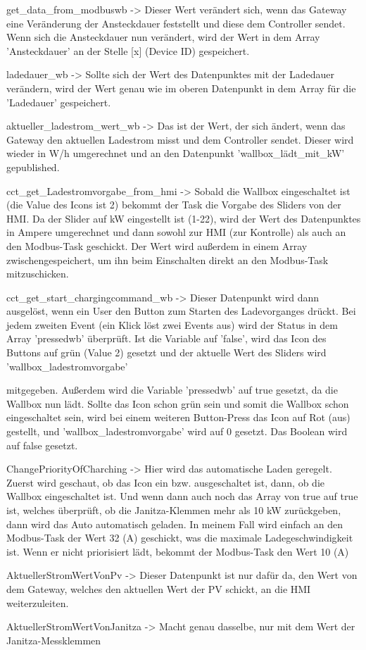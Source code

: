 \begin{compactitem}
\item get\_data\_from\_modbuswb -> Dieser Wert verändert sich, wenn das Gateway eine Veränderung der Ansteckdauer feststellt und diese dem Controller sendet. Wenn sich die Ansteckdauer nun verändert, wird der Wert in dem Array 'Ansteckdauer' an der Stelle [x] (Device ID) gespeichert.
\item ladedauer\_wb -> Sollte sich der Wert des Datenpunktes mit der Ladedauer verändern, wird der Wert genau wie im oberen Datenpunkt in dem Array für die 'Ladedauer' gespeichert.
\item aktueller\_ladestrom\_wert\_wb -> Das ist der Wert, der sich ändert, wenn das Gateway den aktuellen Ladestrom misst und dem Controller sendet. Dieser wird wieder in W/h umgerechnet und an den Datenpunkt 'wallbox\_lädt\_mit\_kW' gepublished.
\item cct\_get\_Ladestromvorgabe\_from\_hmi -> Sobald die Wallbox eingeschaltet ist (die Value des Icons ist 2) bekommt der Task die Vorgabe des Sliders von der HMI. Da der Slider auf kW eingestellt ist (1-22), wird der Wert des Datenpunktes in Ampere umgerechnet und dann sowohl zur HMI (zur Kontrolle) als auch an den Modbus-Task geschickt. Der Wert wird außerdem in einem Array zwischengespeichert, um ihn beim Einschalten direkt an den Modbus-Task mitzuschicken.
\item cct\_get\_start\_chargingcommand\_wb -> Dieser Datenpunkt wird dann ausgelöst, wenn ein User den Button zum Starten des Ladevorganges drückt. Bei jedem zweiten Event (ein Klick löst zwei Events aus) wird der Status in dem Array 'pressedwb' überprüft. Ist die Variable auf 'false', wird das Icon des Buttons auf grün (Value 2) gesetzt und der aktuelle Wert des Sliders wird 'wallbox\_ladestromvorgabe'
\item
mitgegeben. Außerdem wird die Variable 'pressedwb' auf true gesetzt, da die Wallbox nun lädt. Sollte das Icon schon grün sein und somit die Wallbox schon eingeschaltet sein, wird bei einem weiteren Button-Press das Icon auf Rot (aus) gestellt, und 'wallbox\_ladestromvorgabe' wird auf 0 gesetzt. Das Boolean wird auf false gesetzt.
\item ChangePriorityOfCharching -> Hier wird das automatische Laden geregelt. Zuerst wird geschaut, ob das Icon ein bzw. ausgeschaltet ist, dann, ob die Wallbox eingeschaltet ist. Und wenn dann auch noch das Array von true auf true ist, welches überprüft, ob die Janitza-Klemmen mehr als 10 kW zurückgeben, dann wird das Auto automatisch geladen. In meinem Fall wird einfach an den Modbus-Task der Wert 32 (A) geschickt, was die maximale Ladegeschwindigkeit ist. Wenn er nicht priorisiert lädt, bekommt der Modbus-Task den Wert 10 (A)
\item AktuellerStromWertVonPv -> Dieser Datenpunkt ist nur dafür da, den Wert von dem Gateway, welches den aktuellen Wert der PV schickt, an die HMI weiterzuleiten.
\item AktuellerStromWertVonJanitza -> Macht genau dasselbe, nur mit dem Wert der Janitza-Messklemmen
\end{compactitem}



